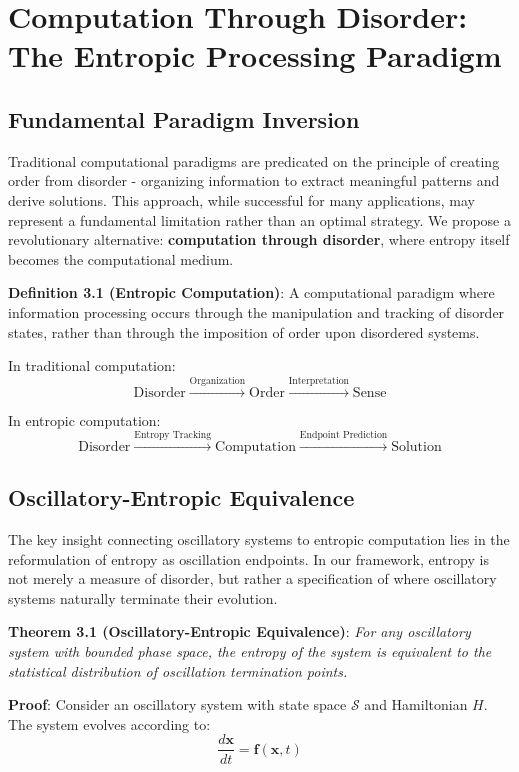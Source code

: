 \documentclass[12pt,a4paper]{article}
\theoremstyle{definition}
\begin{document}
\section{Computation Through Disorder: The Entropic Processing Paradigm}

\subsection{Fundamental Paradigm Inversion}

Traditional computational paradigms are predicated on the principle of creating order from disorder - organizing information to extract meaningful patterns and derive solutions. This approach, while successful for many applications, may represent a fundamental limitation rather than an optimal strategy. We propose a revolutionary alternative: \textbf{computation through disorder}, where entropy itself becomes the computational medium.

\textbf{Definition 3.1 (Entropic Computation)}: A computational paradigm where information processing occurs through the manipulation and tracking of disorder states, rather than through the imposition of order upon disordered systems.

In traditional computation:
$$\text{Disorder} \xrightarrow{\text{Organization}} \text{Order} \xrightarrow{\text{Interpretation}} \text{Sense}$$

In entropic computation:
$$\text{Disorder} \xrightarrow{\text{Entropy Tracking}} \text{Computation} \xrightarrow{\text{Endpoint Prediction}} \text{Solution}$$

\subsection{Oscillatory-Entropic Equivalence}

The key insight connecting oscillatory systems to entropic computation lies in the reformulation of entropy as oscillation endpoints. In our framework, entropy is not merely a measure of disorder, but rather a specification of where oscillatory systems naturally terminate their evolution.

\textbf{Theorem 3.1 (Oscillatory-Entropic Equivalence)}: \textit{For any oscillatory system with bounded phase space, the entropy of the system is equivalent to the statistical distribution of oscillation termination points.}

\textbf{Proof}:
Consider an oscillatory system with state space $\mathcal{S}$ and Hamiltonian $H$. The system evolves according to:
$$\frac{d\mathbf{x}}{dt} = \mathbf{f}(\mathbf{x}, t)$$
\end{document}
